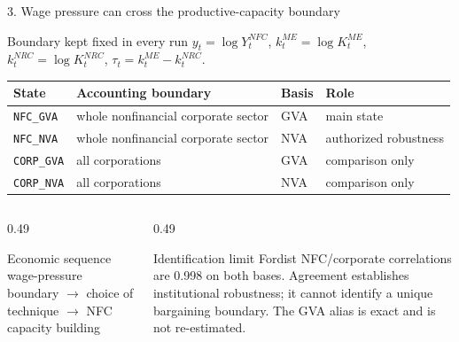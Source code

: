 \documentclass[10pt,aspectratio=169]{beamer}
\begin{document}
\begin{frame}{3. Wage pressure can cross the productive-capacity boundary}
  \begin{block}{Boundary kept fixed in every run}
    \centering
    $y_t=\log Y_t^{NFC}$, \quad $k_t^{ME}=\log K_t^{ME}$, \quad
    $k_t^{NRC}=\log K_t^{NRC}$, \quad $\tau_t=k_t^{ME}-k_t^{NRC}$.
  \end{block}
  \vspace{-0.2em}
  \begin{table}
    \centering
    \small
    \begin{tabular}{@{}llll@{}}
      \toprule
      \textbf{State} & \textbf{Accounting boundary} & \textbf{Basis} & \textbf{Role} \\
      \midrule
      \texttt{NFC\_GVA}  & whole nonfinancial corporate sector & GVA & main state \\
      \texttt{NFC\_NVA}  & whole nonfinancial corporate sector & NVA & authorized robustness \\
      \texttt{CORP\_GVA} & all corporations & GVA & comparison only \\
      \texttt{CORP\_NVA} & all corporations & NVA & comparison only \\
      \bottomrule
    \end{tabular}
  \end{table}
  \begin{columns}[T,onlytextwidth]
    \begin{column}{0.49\textwidth}
      \begin{block}{Economic sequence}
        \centering
        wage-pressure boundary $\rightarrow$ choice of technique
        $\rightarrow$ NFC capacity building
      \end{block}
    \end{column}
    \begin{column}{0.49\textwidth}
      \begin{alertblock}{Identification limit}
        \small
        Fordist NFC/corporate correlations are 0.998 on both bases. Agreement establishes institutional robustness; it cannot identify a unique bargaining boundary. The GVA alias is exact and is not re-estimated.
      \end{alertblock}
    \end{column}
  \end{columns}
\end{frame}
\end{document}
